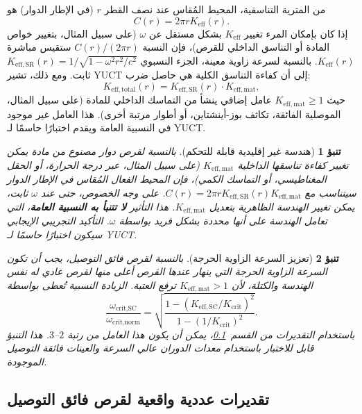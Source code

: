 \documentclass[12pt,a4paper]{article}
\newtheorem{prediction}{تنبؤ}[section]
\begin{document}
	من المترية التناسقية، المحيط المُقاس عند نصف القطر \(r\) (في الإطار الدوار) هو
	\[
	C(r) = 2\pi r K_{\mathrm{eff}}(r).
	\]
	إذا كان بإمكان المرء تغيير \(K_{\mathrm{eff}}\) بشكل مستقل عن \(\omega\) (على سبيل المثال، بتغيير خواص المادة أو التناسق الداخلي للقرص)، فإن النسبة \(C(r)/(2\pi r)\) ستقيس مباشرة \(K_{\mathrm{eff}}(r)\). بالنسبة لسرعة زاوية معينة، الجزء النسبوي \(K_{\mathrm{eff,SR}}(r) = 1/\sqrt{1-\omega^2 r^2/c^2}\) ثابت. ومع ذلك، تشير YUCT إلى أن كفاءة التناسق الكلية هي حاصل ضرب:
	\[
	K_{\mathrm{eff,total}}(r) = K_{\mathrm{eff,SR}}(r) \cdot K_{\mathrm{eff,mat}},
	\]
	حيث \(K_{\mathrm{eff,mat}} \ge 1\) عامل إضافي ينشأ من التماسك الداخلي للمادة (على سبيل المثال، الموصلية الفائقة، تكاثف بوز-أينشتاين، أو أطوار مرتبة أخرى). هذا العامل غير موجود في النسبية العامة ويقدم اختبارًا حاسمًا لـ YUCT.
	
	\begin{prediction}[هندسة غير إقليدية قابلة للتحكم]
		بالنسبة لقرص دوار مصنوع من مادة يمكن تغيير كفاءة تناسقها الداخلية \(K_{\mathrm{eff,mat}}\) (على سبيل المثال، عبر درجة الحرارة، أو الحقل المغناطيسي، أو التماسك الكمي)، فإن المحيط الفعال المُقاس في الإطار الدوار سيتناسب مع \(C(r) = 2\pi r K_{\mathrm{eff,SR}}(r) K_{\mathrm{eff,mat}}\). على وجه الخصوص، حتى عند \(\omega\) ثابت، يمكن تغيير الهندسة الظاهرية بتعديل \(K_{\mathrm{eff,mat}}\). هذا التأثير \textbf{لا تتنبأ به النسبية العامة}، التي تعامل الهندسة على أنها محددة بشكل فريد بواسطة \(\omega\). التأكيد التجريبي الإيجابي سيكون اختبارًا حاسمًا لـ YUCT.
	\end{prediction}
	
	\begin{prediction}[تعزيز السرعة الزاوية الحرجة]
		بالنسبة لقرص فائق التوصيل، يجب أن تكون السرعة الزاوية الحرجة التي ينهار عندها القرص أعلى منها لقرص عادي له نفس الهندسة والكتلة، لأن \(K_{\mathrm{eff,mat}} > 1\) ترفع العتبة. الزيادة النسبية تُعطى بواسطة
		\[
		\frac{\omega_{\text{crit,SC}}}{\omega_{\text{crit,norm}}} = \sqrt{ \frac{1 - (K_{\mathrm{eff,SC}}/K_{\mathrm{crit}})^2}{1 - (1/K_{\mathrm{crit}})^2} }.
		\]
		باستخدام التقديرات من القسم~\ref{subsec:numerical}، يمكن أن يكون هذا العامل من رتبة \(2\)–\(3\). هذا التنبؤ قابل للاختبار باستخدام معدات الدوران عالي السرعة والعينات فائقة التوصيل الموجودة.
	\end{prediction}
	
	\subsection{تقديرات عددية واقعية لقرص فائق التوصيل}
	\label{subsec:numerical}
	
\end{document}

